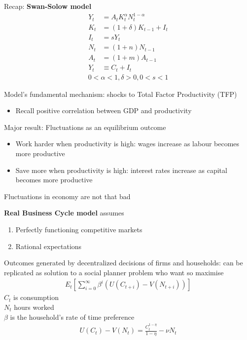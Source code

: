 \documentclass{beamer}
\begin{document}
\begin{frame}
  Recap: \textbf{Swan-Solow model}
  \begin{align}
    Y_t &= A_tK_t^{\alpha}N_t^{1-\alpha}\\
    K_t &= (1+\delta)K_{t-1} + I_t\\
    I_t &= sY_t\\
    N_t &= (1+n)N_{t-1}\\
    A_t &= (1+m)A_{t-1}\\
    Y_t &\equiv C_t + I_t
  \end{align}
  \begin{align*}
    0<\alpha<1, \delta>0, 0<s<1
  \end{align*}
\end{frame}

\begin{frame}
  Model's fundamental mechanism: shocks to Total Factor Productivity (TFP)
  \begin{itemize}
    \item Recall positive correlation between GDP and productivity
  \end{itemize}
  \medskip
  Major result: Fluctuations as an equilibrium outcome
  \begin{itemize}
    \item Work harder when productivity is high: wages increase as labour becomes more productive
    \item Save more when productivity is high: interest rates increase as capital becomes more productive
  \end{itemize}
  \medskip
  Fluctuations in economy are not that bad
\end{frame}


\begin{frame}
  \textbf{Real Business Cycle model} assumes
  \begin{enumerate}
    \item Perfectly functioning competitive markets
    \item Rational expectations
  \end{enumerate}
  \medskip
  Outcomes generated by decentralized decisions of firms and households: can be replicated as solution to a social planner problem who want so maximise
 \begin{align}
  E_t \left[\sum^{\infty}_{i=0} \beta^i(U(C_{t+i})-V(N_{t+i})) \right]
 \end{align}
 $C_t$ is consumption\\
 $N_t$ hours worked\\
 $\beta$ is the household's rate of time preference 
\begin{align}
  U(C_t)-V(N_t)=\frac{C_t^{1-\eta}}{1-\eta}-\nu N_t
\end{align}
\end{frame}
\end{document}
